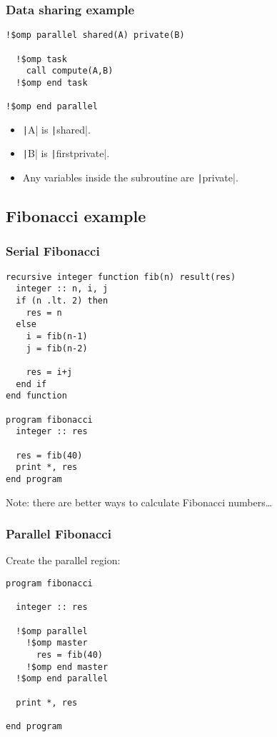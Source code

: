 \documentclass{beamer}
\begin{document}
\begin{frame}[fragile]
\frametitle{Data sharing example}

\begin{verbatim}
!$omp parallel shared(A) private(B)

  !$omp task
    call compute(A,B)
  !$omp end task

!$omp end parallel
\end{verbatim}

\begin{itemize}
  \item \texttt|A| is \texttt|shared|.
  \item \texttt|B| is \texttt|firstprivate|.
  \item Any variables inside the subroutine are \texttt|private|.
\end{itemize}

\end{frame}

\subsection{Fibonacci example}
\begin{frame}[fragile]
\frametitle{Serial Fibonacci}

\begin{verbatim}
recursive integer function fib(n) result(res)
  integer :: n, i, j
  if (n .lt. 2) then
    res = n
  else
    i = fib(n-1)
    j = fib(n-2)

    res = i+j
  end if
end function

program fibonacci
  integer :: res

  res = fib(40)
  print *, res
end program
\end{verbatim}

Note: there are better ways to calculate Fibonacci numbers\dots
\end{frame}

\begin{frame}[fragile]
\frametitle{Parallel Fibonacci}

Create the parallel region:

\begin{verbatim}
program fibonacci

  integer :: res

  !$omp parallel
    !$omp master
      res = fib(40)
    !$omp end master
  !$omp end parallel

  print *, res

end program
\end{verbatim}

\end{frame}
\end{document}
